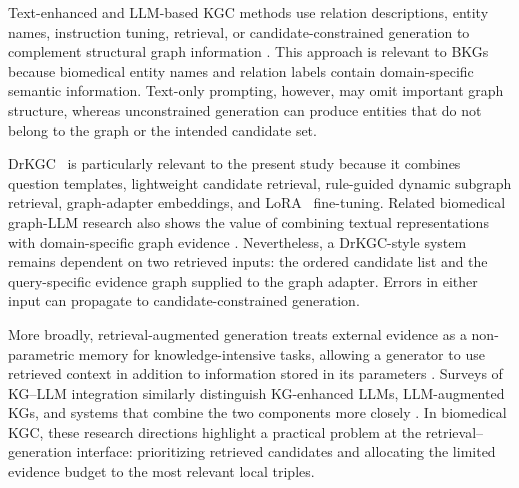 \documentclass[pdflatex,sn-mathphys-num]{sn-jnl}
\newcommand{\drkgc}{DrKGC}
\begin{document}
Text-enhanced and LLM-based KGC methods use relation descriptions, entity names, instruction tuning, retrieval, or candidate-constrained generation to complement structural graph information \citep{devlin2019bert,gu2021domain,luo2022biogpt,wang2022simkgc,wei2026kicgptv2,zhang2024making,liu2024finetuning,wang2024kc}. This approach is relevant to BKGs because biomedical entity names and relation labels contain domain-specific semantic information. Text-only prompting, however, may omit important graph structure, whereas unconstrained generation can produce entities that do not belong to the graph or the intended candidate set.

\drkgc{}~\citep{xiao2025drkgc} is particularly relevant to the present study because it combines question templates, lightweight candidate retrieval, rule-guided dynamic subgraph retrieval, graph-adapter embeddings, and LoRA~\citep{hulora} fine-tuning. Related biomedical graph-LLM research also shows the value of combining textual representations with domain-specific graph evidence \citep{xiao2024fuselinker}. Nevertheless, a \drkgc{}-style system remains dependent on two retrieved inputs: the ordered candidate list and the query-specific evidence graph supplied to the graph adapter. Errors in either input can propagate to candidate-constrained generation.

More broadly, retrieval-augmented generation treats external evidence as a non-parametric memory for knowledge-intensive tasks, allowing a generator to use retrieved context in addition to information stored in its parameters \citep{lewis2020retrieval}. Surveys of KG--LLM integration similarly distinguish KG-enhanced LLMs, LLM-augmented KGs, and systems that combine the two components more closely \citep{pan2024unifying}. In biomedical KGC, these research directions highlight a practical problem at the retrieval--generation interface: prioritizing retrieved candidates and allocating the limited evidence budget to the most relevant local triples.
\end{document}
